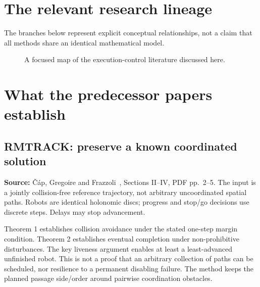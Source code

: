 \documentclass[11pt,a4paper]{article}
\begin{document}
\section{The relevant research lineage}
The branches below represent explicit conceptual relationships, not a claim that
all methods share an identical mathematical model.
\begin{figure}[htbp]
\centering
{}
\caption{A focused map of the execution-control literature discussed here.}
\end{figure}

\section{What the predecessor papers establish}
\subsection{RMTRACK: preserve a known coordinated solution}
\textbf{Source:} \v{C}\'ap, Gregoire and Frazzoli~\cite{rmtrack}, Sections II--IV,
PDF pp.~2--5. The input is a jointly collision-free reference trajectory, not
arbitrary uncoordinated spatial paths. Robots are identical holonomic discs;
progress and stop/go decisions use discrete steps. Delays may stop advancement.

Theorem 1 establishes collision avoidance under the stated one-step margin
condition. Theorem 2 establishes eventual completion under non-prohibitive
disturbances. The key liveness argument enables at least a least-advanced
unfinished robot. This is not a proof that an arbitrary collection of paths can
be scheduled, nor resilience to a permanent disabling failure. The method keeps
the planned passage side/order around pairwise coordination obstacles.
\end{document}
